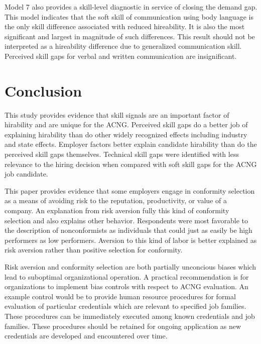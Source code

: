 \documentclass[review]{elsarticle}
\begin{document}
Model 7 also provides a skill-level diagnostic in service of closing the demand gap.
This model indicates that the soft skill of communication using body language is the only skill difference associated with reduced hireability.
It is also the most significant and largest in magnitude of such differences.
This result should not be interpreted as a hireability difference due to generalized communication skill.
Perceived skill gaps for verbal and written communication are insignificant.


\section{Conclusion}


This study provides evidence that skill signals are an important factor of hirability and are unique for the ACNG.
Perceived skill gaps do a better job of explaining hirability than do other widely recognized effects including industry and state effects.
Employer factors better explain candidate hirability than do the perceived skill gaps themselves.
Technical skill gaps were identified with less relevance to the hiring decision when compared with soft skill gaps for the ACNG job candidate.

This paper provides evidence that some employers engage in conformity selection as a means of avoiding risk to the reputation, productivity, or value of a company.
An explanation from risk aversion fully this kind of conformity selection and also explains other behavior.
Respondents were most favorable to the description of nonconformists as individuals that could just as easily be high performers as low performers.
Aversion to this kind of labor is better explained as risk aversion rather than positive selection for conformity.

Risk aversion and conformity selection are both partially unconcious biases which lead to suboptimal organizational operation.
A practical recommendation is for organizations to implement bias controls with respect to ACNG evaluation.
An example control would be to provide human resource procedures for formal evaluation of particular credentials which are relevant to specified job families.
These procedures can be immediately executed among known credentials and job families.
These procedures should be retained for ongoing application as new credentials are developed and encountered over time.
\end{document}
